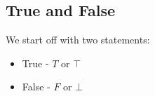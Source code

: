 \subsection{True and False}

We start off with two statements:

\begin{itemize}
\item True - \(T\) or \(\top \)
\item False - \(F\) or \(\bot \)
\end{itemize}

